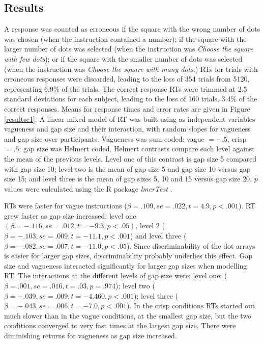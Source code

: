 \documentclass[graybox,envcountchap,sectrefs%
,footinfo
]{svmono}
\begin{document}
\subsection{Results}

A response was counted as erroneous if the square with the wrong number of dots was chosen (when the instruction contained a number); if the square with the larger number of dots was selected (when the instruction was \emph{Choose the square with few dots}); or if the square with the smaller number of dots was selected (when the instruction was \emph{Choose the square with many dots}.) %
RTs for trials with erroneous responses were discarded, leading to the loss of 354 trials from 5120, representing 6.9\% of the trials. The correct response RTs were trimmed at 2.5 standard deviations for each subject, leading to the loss of 160 trials, 3.4\% of the correct responses. Means for response times and error rates are given in Figure  \ref{resultse1}.
A linear mixed model of RT was built using as independent variables vagueness and gap size and their interaction, with random slopes for vagueness and gap size over participants. Vagueness was sum coded: vague $= -.5$, crisp $= .5$; gap size was Helmert coded. Helmert contrasts compare each level against the mean of the previous levels. Level one of this contrast is gap size 5 compared with gap size 10; level two is the mean of gap size 5 and gap size 10 versus gap size 15; and level three is the mean of gap sizes 5, 10 and 15 versus gap size 20. 
$p$ values were calculated using the R package \emph{lmerTest} \citep{lmerTest}.

RTs were faster for vague instructions ($\beta=.109, se=.022, t=4.9, p<.001$). 
%
RT grew faster as gap size increased: level one $(\beta=-.116, se=.012, t=-9.3, p<.05)$, level 2 ($\beta=-.103, se=.009, t=-11.1, p<.001$) and level three ($\beta=-.082, se=.007, t=-11.0, p<.05$). Since discriminability of the dot arrays is easier for larger gap sizes, discriminability probably underlies this effect. Gap size and vagueness interacted significantly for larger gap sizes when modelling RT. %
The interactions at the different levels of gap size were: level one: ($\beta=.001, se=.016, t=.03, p=.974$); level two ($\beta=-.039, se=.009, t=-4.460, p<.001$); level three ($\beta=-.043, se=.006,t=-7.0, p<.001$). In the crisp conditions RTs started out much slower than in the vague conditions, at the smallest gap size, but the two conditions converged to very fast times at the largest gap size. There were diminishing returns for vagueness as gap size increased. 
\end{document}
